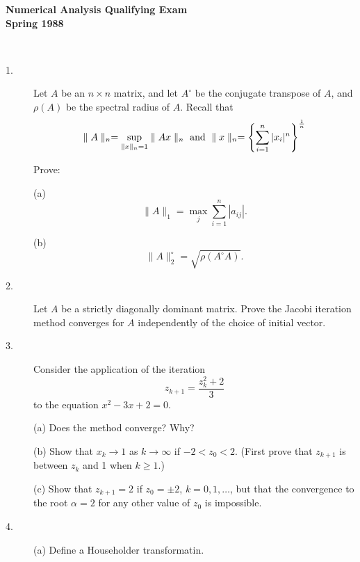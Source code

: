 \documentclass{article}
\begin{document}






\begin{center}\begin{LARGE}
{\bf Numerical Analysis Qualifying Exam}\\ 
{\bf Spring 1988}\\ \end{LARGE}
\end{center}
\vspace{0.1in}
\noindent\hrulefill\\

\begin{description}
\item[1.]
Let $A$ be an $n \times n$ matrix, and let $A^\circ$ be the conjugate
transpose of $A$, and $\rho(A)$ be the spectral radius of $A$. Recall that
$$\parallel A \parallel_n = \sup_{\parallel x \parallel_n = 1}
  \parallel Ax \parallel_n \hbox{\ and\ } \parallel x \parallel_n =
  \left\{\sum^n_{i=1} |x_i|^n \right\}^{\frac{1}{n}}$$

Prove:

\item[\quad] (a)
$$\parallel A \parallel_1 = \max_j \sum^n_{i=1} |a_{ij}|.$$

\item[\quad] (b)
$$\parallel A \parallel_2^\circ = \sqrt{\rho(A^\circ A)}.$$

\item[2.]
Let $A$ be a strictly diagonally dominant matrix. Prove the Jacobi iteration
method converges for $A$ independently of the choice of initial vector.

\item[3.]
Consider the application of the iteration
$$z_{k+1}= \frac{z^2_k + 2}{3}$$
to the equation $x^2 - 3x + 2 = 0$.

\item[\quad] (a)
Does the method converge? Why?

\item[\quad] (b)
Show that $x_k \to 1$ as $k \to \infty$ if $-2 < z_0 < 2$.
(First prove that $z_{k+1}$ is between $z_k$ and 1 when $k \geq 1$.)

\item[\quad] (c)
Show that $z_{k+1} = 2$ if $z_0 = \pm2$, $k=0,1, \dots$, but that the
convergence to the root $\alpha = 2$ for any other value of $z_0$ is
impossible.

\item[4.] (a)
Define a Householder transformatin.


\end{description}
\end{document}

